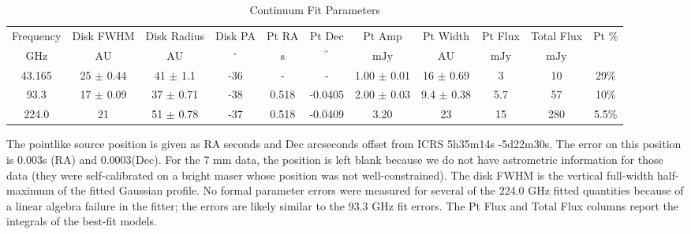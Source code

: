 \begin{table*}[htp]
\centering
\caption{Continuum Fit Parameters}
\begin{tabular}{ccccccccccc}
\label{tab:continuum_fit_parameters}
Frequency & Disk FWHM & Disk Radius & Disk PA & Pt RA & Pt Dec & Pt Amp & Pt Width & Pt Flux & Total Flux & Pt \% \\
$\mathrm{GHz}$ & $\mathrm{AU}$ & $\mathrm{AU}$ & $\mathrm{{}^{\circ}}$ & $\mathrm{s}$ & $\mathrm{{}^{\prime\prime}}$ & $\mathrm{mJy}$ & $\mathrm{AU}$ & $\mathrm{mJy}$ & $\mathrm{mJy}$ & $\mathrm{}$ \\
\hline
43.165 & 25 $\pm$ 0.44 & 41 $\pm$ 1.1 & -36 & - & - & 1.00 $\pm$ 0.01 & 16 $\pm$ 0.69 & 3 & 10 & 29\% \\
93.3 & 17 $\pm$ 0.09 & 37 $\pm$ 0.71 & -38 & 0.518 & -0.0405 & 2.00 $\pm$ 0.03 & 9.4 $\pm$ 0.38 & 5.7 & 57 & 10\% \\
224.0 & 21 & 51 $\pm$ 0.78 & -37 & 0.518 & -0.0409 & 3.20 & 23 & 15 & 280 & 5.5\% \\
\hline
\end{tabular}

\par The pointlike source position is given as RA seconds and Dec arcseconds offset from ICRS 5h35m14s -5d22m30s.  The error on this position is 0.003s (RA) and 0.0003\arcsec (Dec). For the 7 mm data, the position is left blank because we do not have astrometric information for those data (they were self-calibrated on a bright maser whose position was not well-constrained).  The disk FWHM is the vertical full-width half-maximum of the fitted Gaussian profile.  No formal parameter errors were measured for several of the 224.0 GHz fitted quantities because of a linear algebra failure in the fitter; the errors are likely similar to the 93.3 GHz fit errors. The Pt Flux and Total Flux columns report the integrals of the best-fit models.
\end{table*}
